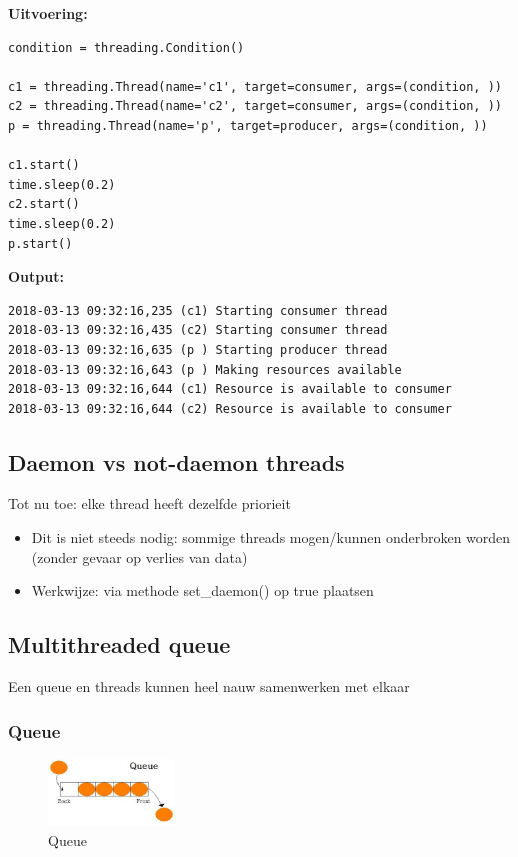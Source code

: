 \documentclass{article}
\begin{document}
\textbf{Uitvoering:}

\begin{verbatim}
condition = threading.Condition()

c1 = threading.Thread(name='c1', target=consumer, args=(condition, ))
c2 = threading.Thread(name='c2', target=consumer, args=(condition, ))
p = threading.Thread(name='p', target=producer, args=(condition, ))

c1.start()
time.sleep(0.2)
c2.start()
time.sleep(0.2)
p.start()
\end{verbatim}

\textbf{Output:}

\begin{verbatim}
2018-03-13 09:32:16,235 (c1) Starting consumer thread
2018-03-13 09:32:16,435 (c2) Starting consumer thread
2018-03-13 09:32:16,635 (p ) Starting producer thread
2018-03-13 09:32:16,643 (p ) Making resources available
2018-03-13 09:32:16,644 (c1) Resource is available to consumer
2018-03-13 09:32:16,644 (c2) Resource is available to consumer

\end{verbatim}

\subsection{Daemon vs not-daemon threads}

Tot nu toe: elke thread heeft dezelfde priorieit

\begin{itemize}
    \item Dit is niet steeds nodig: sommige threads mogen/kunnen onderbroken worden (zonder gevaar op verlies van data)
    \item Werkwijze: via methode set\_daemon() op true plaatsen
\end{itemize}

\subsection{Multithreaded queue}

Een queue en threads kunnen heel nauw samenwerken met elkaar

\subsubsection{Queue}

\begin{figure}[H]
    \centering
    \includegraphics[width=0.3\textwidth]{queue.png}
    \caption{Queue}
\end{figure}
\end{document}
